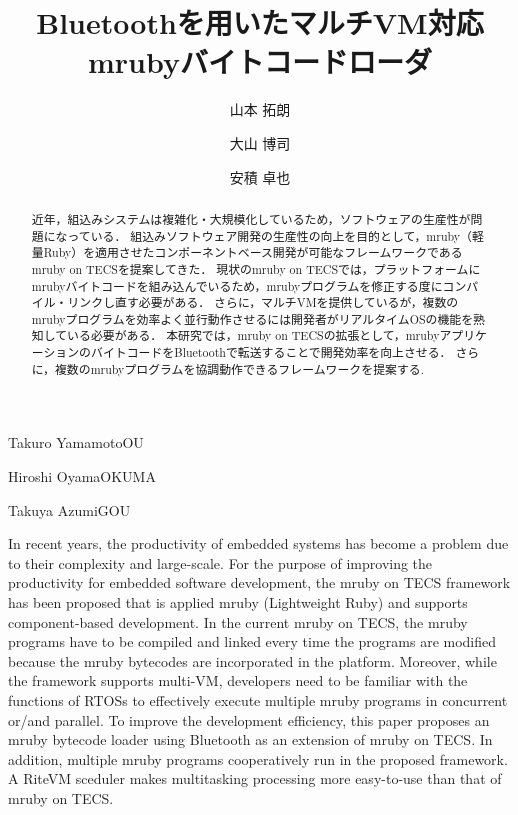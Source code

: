 \documentclass[submit,techrep]{ipsj}
\begin{document}
\title{Bluetoothを用いたマルチVM対応\\mrubyバイトコードローダ}





\author{山本 拓朗}{Takuro Yamamoto}{OU}%
\author{大山 博司}{Hiroshi Oyama}{OKUMA}%
\author{安積 卓也}{Takuya Azumi}{GOU}%

\begin{abstract}
近年，組込みシステムは複雑化・大規模化しているため，ソフトウェアの生産性が問題になっている．
組込みソフトウェア開発の生産性の向上を目的として，mruby（軽量Ruby）を適用させたコンポーネントベース開発が可能なフレームワークであるmruby on TECSを提案してきた．
現状のmruby on TECSでは，プラットフォームにmrubyバイトコードを組み込んでいるため，mrubyプログラムを修正する度にコンパイル・リンクし直す必要がある．
さらに，マルチVMを提供しているが，複数のmrubyプログラムを効率よく並行動作させるには開発者がリアルタイムOSの機能を熟知している必要がある．
本研究では，mruby on TECSの拡張として，mrubyアプリケーションのバイトコードをBluetoothで転送することで開発効率を向上させる．
さらに，複数のmrubyプログラムを協調動作できるフレームワークを提案する.

\end{abstract}


\begin{eabstract}
In recent years, the productivity of embedded systems has become a problem due to their complexity and large-scale.
For the purpose of improving the productivity for embedded software development, the mruby on TECS framework has been proposed that is applied mruby (Lightweight Ruby) and supports component-based development.
In the current mruby on TECS, the mruby programs have to be compiled and linked every time the programs are modified because the mruby bytecodes are incorporated in the platform.
Moreover, while the framework supports multi-VM, developers need to be familiar with the functions of RTOSs to effectively execute multiple mruby programs in concurrent or/and parallel.
To improve the development efficiency, this paper proposes an mruby bytecode loader using Bluetooth as an extension of mruby on TECS.
In addition, multiple mruby programs cooperatively run in the proposed framework.
A RiteVM sceduler makes multitasking processing more easy-to-use than that of mruby on TECS.
\end{eabstract}
\end{document}
